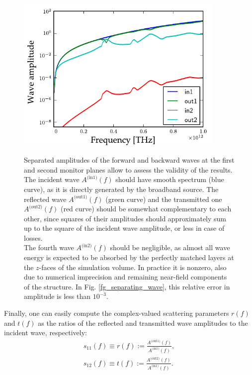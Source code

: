 \begin{figure}[ht] \caption{Separated amplitudes of the forward and backward waves at the first and second monitor planes 
allow to assess the validity of the results.\\
The incident wave $A^{\text{(in1)}}(f)$ should have smooth spectrum (blue curve), as it is directly generated by the broadband source. The reflected wave $A^{\text{(out1)}}(f)$ (green curve) and the transmitted one $A^{\text{(out2)}}(f)$ (red curve) should be somewhat complementary to each other, since squares of their amplitudes should approximately sum up to the square of the incident wave amplitude, or less in case of losses. \\
The fourth wave $A^{\text{(in2)}}(f)$ should be negligible, as almost all wave energy is expected to be absorbed by the perfectly matched layers at the $z$-faces of the simulation volume. In practice it is nonzero, also due to numerical imprecision and remaining near-field components of the structure. In Fig. \ref{fg_separating_wave}, this relative error in amplitude is less than $10^{-3}$.}  \centering \includegraphics[width=10cm]{img/sim_ampli_debug_band.pdf}\label{fg_ampli} \end{figure} 

Finally, one can easily compute the complex-valued scattering parameters $r(f)$ and $t(f)$ as the ratios of the reflected and transmitted wave amplitudes to the incident wave, respectively:
\begin{equation} 
	\begin{split}
		s_{11}(f) \equiv r(f) := \frac{A^{\text{(out1)}}(f)}{A^{\text{(in1)}}(f)},\\
		s_{12}(f) \equiv t(f) := \frac{A^{\text{(out2)}}(f)}{A^{\text{(in1)}}(f)}.
	\end{split}
\label{eq_sparam}\end{equation}

